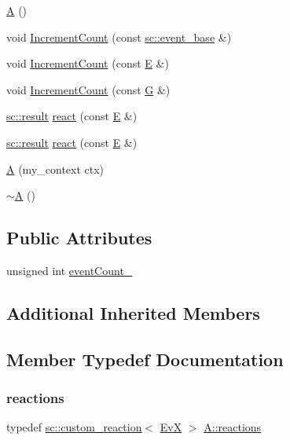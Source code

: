 \begin{DoxyCompactItemize}
\mbox{\hyperlink{struct_a_a4142862ec27f2f3d8deb026d51a5c5a0}{A}} ()
\item 
void \mbox{\hyperlink{struct_a_a7811ed8883449fde0d5f59bd2ebf3de5}{Increment\+Count}} (const \mbox{\hyperlink{classboost_1_1statechart_1_1event__base}{sc\+::event\+\_\+base}} \&)
\item 
void \mbox{\hyperlink{struct_a_afb9a418cf38492b6c1c50dbe1df1e741}{Increment\+Count}} (const \mbox{\hyperlink{struct_e}{E}} \&)
\item 
void \mbox{\hyperlink{struct_a_abf23b59d725012e048a7f5e3ae1c52ca}{Increment\+Count}} (const \mbox{\hyperlink{struct_g}{G}} \&)
\item 
\mbox{\hyperlink{namespaceboost_1_1statechart_abe807f6598b614d6d87bb951ecd92331}{sc\+::result}} \mbox{\hyperlink{struct_a_a7eaee5c73ef0a2a5fb0886b4b1bc4a48}{react}} (const \mbox{\hyperlink{struct_e}{E}} \&)
\item 
\mbox{\hyperlink{namespaceboost_1_1statechart_abe807f6598b614d6d87bb951ecd92331}{sc\+::result}} \mbox{\hyperlink{struct_a_a7eaee5c73ef0a2a5fb0886b4b1bc4a48}{react}} (const \mbox{\hyperlink{struct_e}{E}} \&)
\item 
\mbox{\hyperlink{struct_a_aa7bea9bf6fe35fcde90da1f5a06ba4e9}{A}} (my\+\_\+context ctx)
\item 
\mbox{\hyperlink{struct_a_a8d74412b1ff05d7493b4c546795bf405}{$\sim$A}} ()
\end{DoxyCompactItemize}
\subsection*{Public Attributes}
\begin{DoxyCompactItemize}
\item 
unsigned int \mbox{\hyperlink{struct_a_a3c06744fc190a128fd536cf61f15e88b}{event\+Count\+\_\+}}
\end{DoxyCompactItemize}
\subsection*{Additional Inherited Members}


\subsection{Member Typedef Documentation}
\mbox{\label{struct_a_aca29ac82093be1c88d8177f5108af763}} 
\subsubsection{\texorpdfstring{reactions}{reactions}\hspace{0.1cm}{\footnotesize\ttfamily [1/13]}}
{\footnotesize\ttfamily typedef \mbox{\hyperlink{classboost_1_1statechart_1_1custom__reaction}{sc\+::custom\+\_\+reaction}}$<$ \mbox{\hyperlink{struct_ev_x}{EvX}} $>$ \mbox{\hyperlink{struct_a_aaf7ef039e669b21e19f81777afeed659}{A\+::reactions}}}

